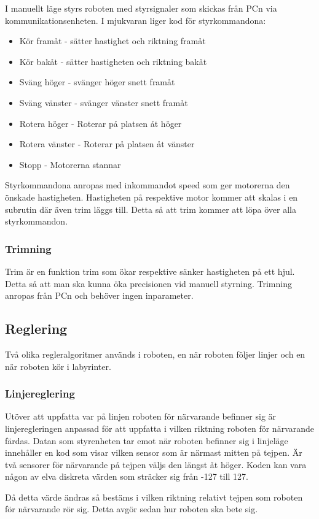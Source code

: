 I manuellt läge styrs roboten med styrsignaler som skickas från PCn via 
kommunikationsenheten. I mjukvaran liger kod för styrkommandona:
\begin{itemize}
\item Kör framåt - sätter hastighet och riktning framåt
\item Kör bakåt - sätter hastigheten och riktning bakåt
\item Sväng höger - svänger höger snett framåt
\item Sväng vänster - svänger vänster snett framåt
\item Rotera höger - Roterar på platsen åt höger
\item Rotera vänster - Roterar på platsen åt vänster
\item Stopp - Motorerna stannar
\end{itemize}
Styrkommandona anropas med inkommandot speed som ger motorerna den
önskade hastigheten. Hastigheten på respektive motor kommer att skalas i en subrutin
där även trim läggs till. Detta så att trim kommer att löpa över alla styrkommandon.

\subsubsection{Trimning}
Trim är en funktion trim som ökar respektive sänker hastigheten på ett hjul. 
Detta så att man ska kunna öka precisionen vid manuell styrning. Trimning 
anropas från PCn och behöver ingen inparameter.

\subsection{Reglering}
Två olika regleralgoritmer används i roboten, en när roboten följer linjer och
en när roboten kör i labyrinter.
\subsubsection{Linjereglering}
\label{sec:linjereglering}
Utöver att uppfatta var på linjen roboten för närvarande befinner sig är 
linjeregleringen anpassad för att uppfatta i vilken riktning roboten för 
närvarande färdas. Datan som styrenheten tar emot när roboten befinner sig i 
linjeläge innehåller en kod som visar vilken sensor som är närmast mitten på 
tejpen. Är två sensorer för närvarande på tejpen väljs den längst åt höger. 
Koden kan vara någon av elva diskreta värden som sträcker sig från -127 till 127.

Då detta värde ändras så bestäms i vilken riktning relativt tejpen som 
roboten för närvarande rör sig. Detta avgör sedan hur roboten ska bete sig.

